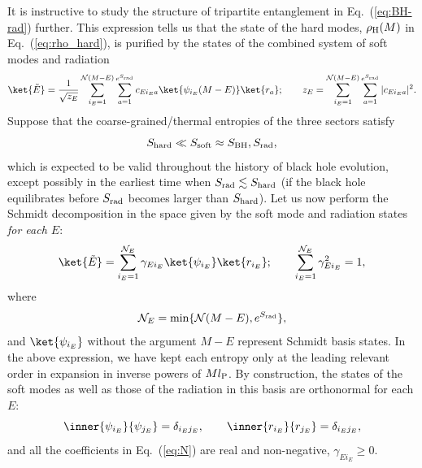 \documentclass[12pt]{article}
\begin{document}
It is instructive to study the structure of tripartite 
entanglement in Eq.~(\ref{eq:BH-rad}) further.  This expression 
tells us that the state of the hard modes, $\rho_{\rm H}(M)$ 
in Eq.~(\ref{eq:rho_hard}), is purified by the states of the 
combined system of soft modes and radiation
%
\begin{equation}
  \ket{\tilde{E}} 
  = \frac{1}{\sqrt{z_E}} \sum_{i_E = 1}^{{\cal N}(M-E)} 
    \sum_{a = 1}^{e^{S_{\rm rad}}} 
    c_{E i_E a} \ket{\psi_{i_E}(M-E)} \ket{r_a};
\qquad
  z_E = \sum_{i_E = 1}^{{\cal N}(M-E)} 
    \sum_{a = 1}^{e^{S_{\rm rad}}} |c_{E i_E a}|^2.
\label{eq:mirror-st}
\end{equation}
%
Suppose that the coarse-grained/thermal entropies of the three 
sectors satisfy
%
\begin{equation}
  S_{\rm hard} \ll S_{\rm soft} \approx S_{\rm BH}, S_{\rm rad},
\label{eq:S-rel}
\end{equation}
%
which is expected to be valid throughout the history of black hole 
evolution, except possibly in the earliest time when $S_{\rm rad} 
\lesssim S_{\rm hard}$ (if the black hole equilibrates before 
$S_{\rm rad}$ becomes larger than $S_{\rm hard}$).  Let us now 
perform the Schmidt decomposition in the space given by the soft 
mode and radiation states {\it for each $E$}:
%
\begin{equation}
  \ket{\tilde{E}} = \sum_{i_E=1}^{{\cal N}_E} 
    \gamma_{E i_E} \ket{\psi_{i_E}} \ket{r_{i_E}};
\qquad
  \sum_{i_E=1}^{{\cal N}_E} \gamma_{E i_E}^2 = 1,
\label{eq:Schmidt}
\end{equation}
%
where
%
\begin{equation}
  {\cal N}_E = {\rm min}\{ {\cal N}(M-E), e^{S_{\rm rad}} \},
\label{eq:N}
\end{equation}
%
and $\ket{\psi_{i_E}}$ without the argument $M-E$ represent Schmidt 
basis states.  In the above expression, we have kept each entropy 
only at the leading relevant order in expansion in inverse powers 
of $M l_{\rm P}$.  By construction, the states of the soft modes 
as well as those of the radiation in this basis are orthonormal 
for each $E$:
%
\begin{equation}
  \inner{\psi_{i_E}}{\psi_{j_E}} = \delta_{i_E j_E},
\qquad
  \inner{r_{i_E}}{r_{j_E}} = \delta_{i_E j_E},
\label{eq:Sch-orthonorm}
\end{equation}
%
and all the coefficients in Eq.~(\ref{eq:N}) are real and 
non-negative, $\gamma_{E i_E} \geq 0$.
\end{document}
